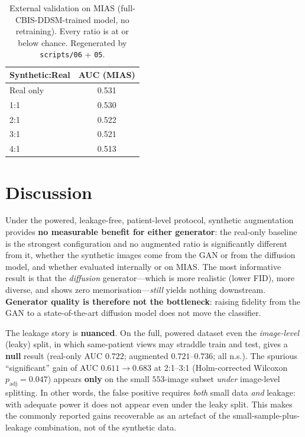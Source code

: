 \documentclass[runningheads]{llncs}
\begin{document}
\begin{table}[t]
\centering
\caption{External validation on MIAS (full-CBIS-DDSM-trained model, no
retraining). Every ratio is at or below chance. Regenerated by
\texttt{scripts/06} + \texttt{05}.}
\label{tab:external}
\begin{tabular}{lc}
\toprule
Synthetic:Real & AUC (MIAS) \\
\midrule
Real only & 0.531 \\
1:1 & 0.530 \\
2:1 & 0.522 \\
3:1 & 0.521 \\
4:1 & 0.513 \\
\bottomrule
\end{tabular}
\end{table}

\section{Discussion}
Under the powered, leakage-free, patient-level protocol, synthetic augmentation
provides \textbf{no measurable benefit for either generator}: the real-only
baseline is the strongest configuration and no augmented ratio is significantly
different from it, whether the synthetic images come from the GAN or from the
diffusion model, and whether evaluated internally or on MIAS. The most
informative result is that the \emph{diffusion} generator---which is more
realistic (lower FID), more diverse, and shows zero memorisation---\emph{still}
yields nothing downstream. \textbf{Generator quality is therefore not the
bottleneck}: raising fidelity from the GAN to a state-of-the-art diffusion model
does not move the classifier.

The leakage story is \textbf{nuanced}. On the full, powered dataset even the
\emph{image-level} (leaky) split, in which same-patient views may straddle train
and test, gives a \textbf{null} result (real-only AUC $0.722$; augmented
$0.721$--$0.736$; all n.s.). The spurious ``significant'' gain of AUC
$0.611\!\to\!0.683$ at 2:1--3:1 (Holm-corrected Wilcoxon $p_\text{adj}{=}0.047$)
appears \textbf{only} on the small $553$-image subset \emph{under} image-level
splitting. In other words, the false positive requires \emph{both} small data
\emph{and} leakage: with adequate power it does not appear even under the leaky
split. This makes the commonly reported gains recoverable as an artefact of the
small-sample-plus-leakage combination, not of the synthetic data.
\end{document}
